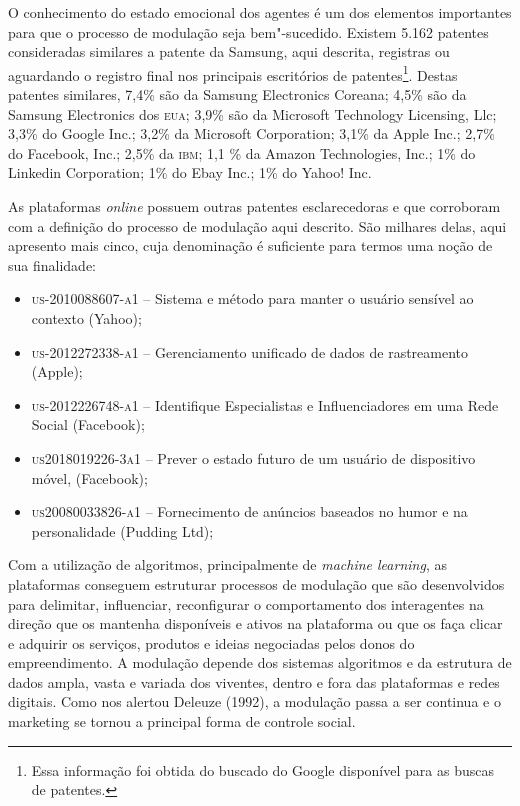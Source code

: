 O conhecimento do estado emocional dos agentes é um dos elementos
importantes para que o processo de modulação seja bem"-sucedido. Existem
5.162 patentes consideradas similares a patente da Samsung, aqui
descrita, registras ou aguardando o registro final nos principais
escritórios de patentes\footnote{Essa informação foi obtida do buscado
  do Google disponível para as buscas de patentes.}. Destas patentes
similares, 7,4\% são da Samsung Electronics Coreana; 4,5\% são da
Samsung Electronics dos \textsc{eua}; 3,9\% são da Microsoft Technology
Licensing, Llc; 3,3\% do Google Inc.; 3,2\% da Microsoft Corporation;
3,1\% da Apple Inc.; 2,7\% do Facebook, Inc.; 2,5\% da \textsc{ibm}; 1,1 \% da
Amazon Technologies, Inc.; 1\% do Linkedin Corporation; 1\% do Ebay
Inc.; 1\% do Yahoo! Inc.

As plataformas \emph{online} possuem outras patentes esclarecedoras e que
corroboram com a definição do processo de modulação aqui descrito. São
milhares delas, aqui apresento mais cinco, cuja denominação é suficiente
para termos uma noção de sua finalidade:

\begin{itemize}
\item
  \textsc{us-2010088607-a1} -- Sistema e método para manter o usuário sensível ao
  contexto (Yahoo);
\item
  \textsc{us-2012272338-a1} -- Gerenciamento unificado de dados de rastreamento
  (Apple);
\item
  \textsc{us-2012226748-a1} -- Identifique Especialistas e Influenciadores em uma
  Rede Social (Facebook);
\item
  \textsc{us2018019226-3a1} -- Prever o estado futuro de um usuário de dispositivo
  móvel, (Facebook);
\item
  \textsc{us20080033826-a1} -- Fornecimento de anúncios baseados no humor e na
  personalidade (Pudding Ltd);
\end{itemize}

Com a utilização de algoritmos, principalmente de \emph{machine
learning}, as plataformas conseguem estruturar processos de modulação
que são desenvolvidos para delimitar, influenciar, reconfigurar o
comportamento dos interagentes na direção que os mantenha disponíveis e
ativos na plataforma ou que os faça clicar e adquirir os serviços,
produtos e ideias negociadas pelos donos do empreendimento. A modulação
depende dos sistemas algoritmos e da estrutura de dados ampla, vasta e
variada dos viventes, dentro e fora das plataformas e redes digitais.
Como nos alertou Deleuze (1992), a modulação passa a ser continua e o
marketing se tornou a principal forma de controle social.

